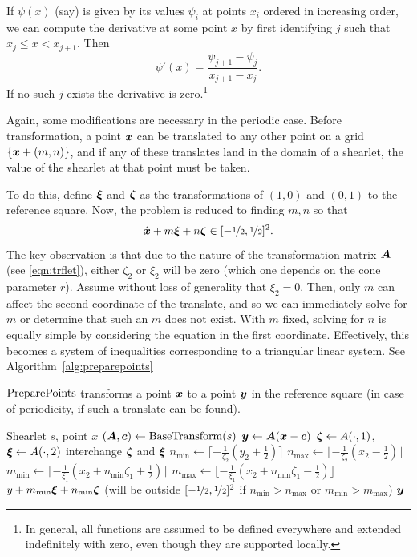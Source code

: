 If $\psi(x)$ (say) is given by its values $\psi_i$ at points $x_i$ ordered in increasing order, we can compute
the derivative at some point $x$ by first identifying $j$ such that $x_j\leq x<x_{j+1}$. Then
\[ \psi'(x) = \frac{\psi_{j+1}-\psi_{j}}{x_{j+1}-x_j}. \]
If no such $j$ exists the derivative is zero.\footnote{In general, all functions are assumed to be defined
everywhere and extended indefinitely with zero, even though they are supported locally.}

Again, some modifications are necessary in the periodic case. Before transformation, a point ${\bm x}$ can be
translated to any other point on a grid $\left\{{\bm x}+(m,n)\right\}$, and if any of these translates land in the
domain of a shearlet, the value of the shearlet at that point must be taken.

To do this, define ${\bm\xi}$ and ${\bm\zeta}$ as the transformations of $(1,0)$ and $(0,1)$ to the reference square.
Now, the problem is reduced to finding $m,n$ so that
\[
    \hat{{\bm x}}+m{\bm\xi}+n{\bm\zeta} \in [-\nicefrac{1}{2},\nicefrac{1}{2}]^2.
\]
The key observation is that due to the nature of the transformation matrix ${\bm A}$ (see \eqref{eqn:trflet}),
either $\zeta_2$ or $\xi_2$ will be zero (which one depends on the cone parameter $r$). Assume without loss of
generality that $\xi_2=0$. Then, only $m$ can affect the second coordinate of the translate, and so we can
immediately solve for $m$ or determine that such an $m$ does not exist. With $m$ fixed, solving for $n$ is
equally simple by considering the equation in the first coordinate. Effectively, this becomes a system of
inequalities corresponding to a triangular linear system. See Algorithm~\ref{alg:preparepoints}

\begin{algorithm}
\caption{$\operatorname{PreparePoints}$ transforms a point ${\bm x}$ to a point ${\bm y}$ in the reference square (in case of
periodicity, if such a translate can be found).} \label{alg:preparepoints}
\begin{algorithmic}[1]
\REQUIRE Shearlet $s$, point $x$
\STATE $({\bm A},{\bm c})\leftarrow\operatorname{BaseTransform}(s)$
\STATE ${\bm y}\leftarrow {\bm A}({\bm x}-{\bm c})$
\STATE ${\bm\zeta}\leftarrow A(\cdot,1)$, ${\bm\xi}\leftarrow A(\cdot,2)$
\STATE interchange ${\bm\zeta}$ and ${\bm\xi}$
\ENDIF
\STATE $n_{\min}\leftarrow \lceil-\frac{1}{\zeta_2}(y_2+\frac{1}{2})\rceil$
\STATE $n_{\max}\leftarrow \lfloor-\frac{1}{\zeta_2}(x_2-\frac{1}{2})\rfloor$
\STATE $m_{\min}\leftarrow \lceil-\frac{1}{\xi_1}(x_2+n_{\min}\zeta_1+\frac{1}{2})\rceil$
\STATE $m_{\max}\leftarrow \lfloor-\frac{1}{\xi_1}(x_2+n_{\min}\zeta_1-\frac{1}{2})\rfloor$
\RETURN $y+m_{\min}{\bm\xi}+n_{\min}{\bm\zeta}$ 
\STATE (will be outside $[-\nicefrac{1}{2},\nicefrac{1}{2}]^2$ if $n_{\min}>n_{\max}$ or $m_{\min}>m_{\max}$)
\ELSE
\RETURN ${\bm y}$
\ENDIF
\end{algorithmic}
\end{algorithm}

